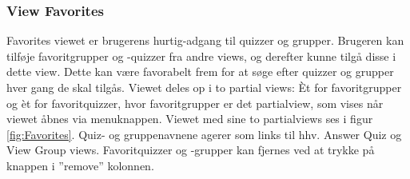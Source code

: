 \subsubsection{View Favorites}
Favorites viewet er brugerens hurtig-adgang til quizzer og grupper. Brugeren kan tilføje favoritgrupper og -quizzer fra andre views, og derefter kunne tilgå disse i dette view. Dette kan være favorabelt frem for at søge efter quizzer og grupper hver gang de skal tilgås. \newline
Viewet deles op i to partial views: Èt for favoritgrupper og èt for favoritquizzer, hvor favoritgrupper er det partialview, som vises når viewet åbnes via menuknappen. Viewet med sine to partialviews ses i figur \ref{fig:Favorites}.
Quiz- og gruppenavnene agerer som links til hhv. Answer Quiz og View Group views. Favoritquizzer og -grupper kan fjernes ved at trykke på knappen i ''remove'' kolonnen.


